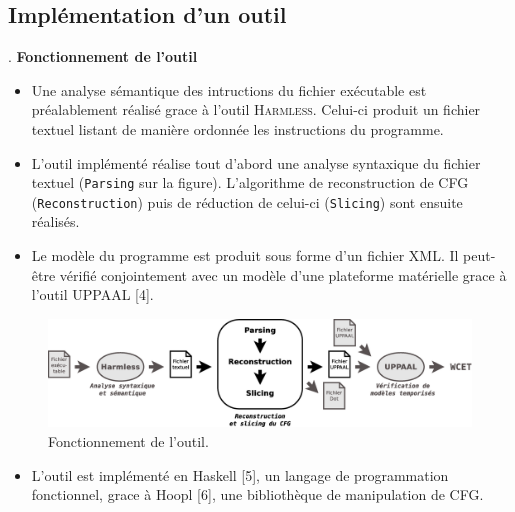 \documentclass[final]{beamer}
\begin{document}
\begin{frame}
\begin{textblock}{39}
      \section{Implémentation d'un outil}
      \begin{block}{\thesection. \secname}
        \textbf{Fonctionnement de l'outil}
        \begin{itemize}
          \item[] Une analyse sémantique des intructions du fichier exécutable
            est préalablement réalisé grace à l'outil
            \textsc{Harmless}. Celui-ci produit un fichier textuel listant de
            manière ordonnée les instructions du programme.
            \vspace{.5em}

          \item[] L'outil implémenté réalise tout d'abord une analyse syntaxique
            du fichier textuel (\texttt{Parsing} sur la figure). L'algorithme de
            reconstruction de CFG (\texttt{Reconstruction}) puis de réduction de
            celui-ci (\texttt{Slicing}) sont ensuite réalisés.
            \vspace{.5em}
        
        \item[] Le modèle du programme est produit sous forme d'un fichier
          \textsc{XML}. Il peut-être vérifié conjointement avec un modèle d'une
          plateforme matérielle grace à l'outil \textsc{UPPAAL} [4].
        \end{itemize}

        \begin{figure}
          \centering
          \includegraphics[scale=0.9]{archi.eps}
          \caption{Fonctionnement de l'outil.}
        \end{figure}

        \begin{itemize}
          \item[] L'outil est implémenté en Haskell [5], un langage de programmation
            fonctionnel, grace à Hoopl [6], une bibliothèque de manipulation de
            CFG.
        \end{itemize}


\end{block}
\end{textblock}
\end{frame}
\end{document}
